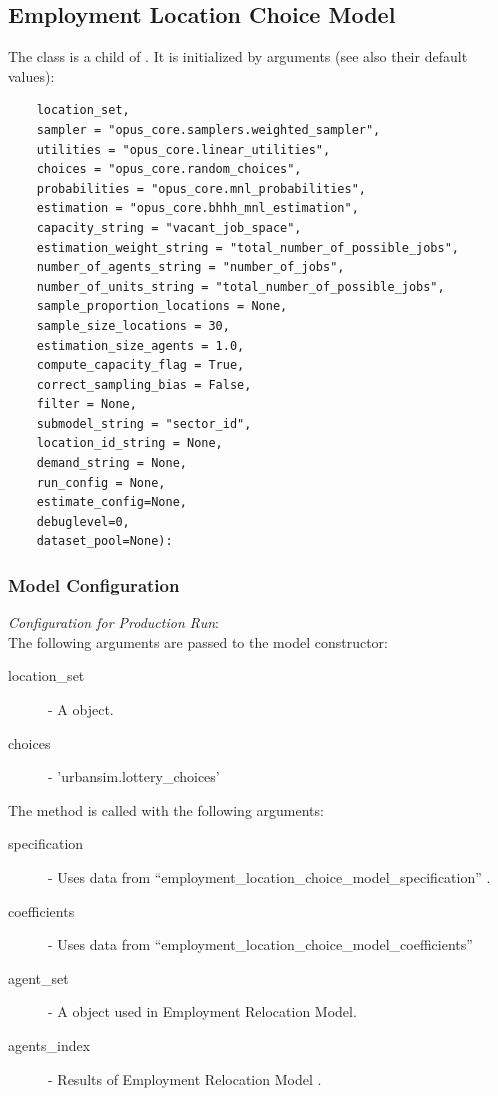 \subsection{Employment Location Choice Model}
\modelsindex
\label{sec:elcm} 
%
The class  is a child of . 
It is initialized by arguments (see also their default values):
\begin{verbatim}
    location_set, 
    sampler = "opus_core.samplers.weighted_sampler", 
    utilities = "opus_core.linear_utilities", 
    choices = "opus_core.random_choices", 
    probabilities = "opus_core.mnl_probabilities", 
    estimation = "opus_core.bhhh_mnl_estimation", 
    capacity_string = "vacant_job_space",
    estimation_weight_string = "total_number_of_possible_jobs",
    number_of_agents_string = "number_of_jobs",
    number_of_units_string = "total_number_of_possible_jobs",
    sample_proportion_locations = None, 
    sample_size_locations = 30, 
    estimation_size_agents = 1.0, 
    compute_capacity_flag = True, 
    correct_sampling_bias = False,
    filter = None,
    submodel_string = "sector_id", 
    location_id_string = None,
    demand_string = None, 
    run_config = None, 
    estimate_config=None, 
    debuglevel=0, 
    dataset_pool=None):
\end{verbatim}


\subsubsection{Model Configuration}
\modelsindex
%
{\em Configuration for Production Run}:\\[1mm]
The following arguments are passed to the model constructor:
\begin{description}
\item[location_set] - A  object.
\item[choices] - 'urbansim.lottery_choices'
\end{description}

The  method is called with the following arguments:
\begin{description}
\item[specification] - Uses data from
  ``employment_location_choice_model_specification'' .
\item[coefficients] - Uses data from ``employment_location_choice_model_coefficients'' 
\item[agent_set] - A  object used in Employment Relocation Model. 
\item[agents_index] - Results of Employment Relocation Model .
\end{description}
 
